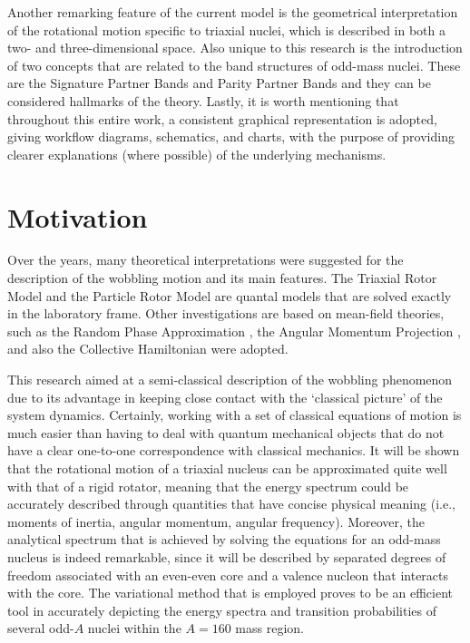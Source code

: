 Another remarking feature of the current model is the geometrical interpretation of the rotational motion specific to triaxial nuclei, which is described in both a two- and three-dimensional space. Also unique to this research is the introduction of two concepts that are related to the band structures of odd-mass nuclei. These are the Signature Partner Bands and Parity Partner Bands and they can be considered hallmarks of the theory. Lastly, it is worth mentioning that throughout this entire work, a consistent graphical representation is adopted, giving workflow diagrams, schematics, and charts, with the purpose of providing clearer explanations (where possible) of the underlying mechanisms.

\section{Motivation}

Over the years, many theoretical interpretations were suggested for the description of the wobbling motion and its main features. The Triaxial Rotor Model \cite{bohr1998nuclear,davydov1958rotational} and the Particle Rotor Model \cite{hamamoto2002wobbling} are quantal models that are solved exactly in the laboratory frame. Other investigations are based on mean-field theories, such as the Random Phase Approximation \cite{shimizu1995nuclear}, the Angular Momentum Projection \cite{oi2000wobbling}, and also the Collective Hamiltonian \cite{chen2014collective} were adopted.

This research aimed at a semi-classical description of the wobbling phenomenon due to its advantage in keeping close contact with the `classical picture' of the system dynamics. Certainly, working with a set of classical equations of motion is much easier than having to deal with quantum mechanical objects that do not have a clear one-to-one correspondence with classical mechanics. It will be shown that the rotational motion of a triaxial nucleus can be approximated quite well with that of a rigid rotator, meaning that the energy spectrum could be accurately described through quantities that have concise physical meaning (i.e., moments of inertia, angular momentum, angular frequency). Moreover, the analytical spectrum that is achieved by solving the equations for an odd-mass nucleus is indeed remarkable, since it will be described by separated degrees of freedom associated with an even-even core and a valence nucleon that interacts with the core. The variational method that is employed proves to be an efficient tool in accurately depicting the energy spectra and transition probabilities of several odd-$A$ nuclei within the $A=160$ mass region.

